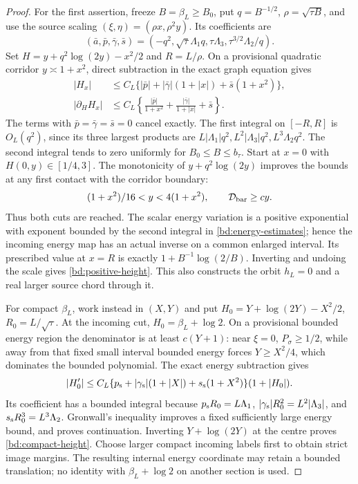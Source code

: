 \begin{proof}
For the first assertion, freeze \(B=\beta_L\ge B_0\), put
\(q=B^{-1/2}\), \(\rho=\sqrt{\tau B}\), and use the source
scaling \((\xi,\eta)=(\rho x,\rho^2y)\).  Its coefficients are
\[
 (\bar a,\bar p,\bar\gamma,\bar s)
 =(-q^2,\sqrt\tau\Lambda_1q,\tau\Lambda_3,
                         \tau^{3/2}\Lambda_2/q).
\]
Set \(H=y+q^2\log(2y)-x^2/2\) and \(R=L/\rho\).
On a provisional quadratic corridor \(y\asymp1+x^2\), direct
subtraction in the exact graph equation gives
\begin{equation}\label{bd:energy-estimates}
\begin{split}
 |H_x|&\le C_L\{|
 \bar p|+|\bar\gamma|(1+|x|)+\bar s(1+x^2)\},\\
 |\partial_HH_x|&\le C_L\left\{
 \frac{|\bar p|}{1+x^2}+
 \frac{|\bar\gamma|}{1+|x|}+\bar s\right\}.
\end{split}
\end{equation}
The terms with \(\bar p=\bar\gamma=\bar s=0\) cancel exactly.
The first integral on \([-R,R]\) is \(O_L(q^2)\), since its three
largest products are
\(L|\Lambda_1|q^2,L^2|\Lambda_3|q^2,L^3\Lambda_2q^2\).
The second integral tends to zero uniformly for
\(B_0\le B\le b_\tau\).  Start at \(x=0\) with
\(H(0,y)\in[1/4,3]\).  The monotonicity of
\(y+q^2\log(2y)\) improves the bounds at any first contact with the corridor boundary:
\[
 (1+x^2)/16<y<4(1+x^2),\qquad \mathcal D_{\rm bar}\ge cy.
\]
Thus both cuts are reached.  The scalar energy variation is a positive
exponential with exponent bounded by the second integral in
\eqref{bd:energy-estimates}; hence the incoming energy map has an
actual inverse on a common enlarged interval.  Its prescribed value at
\(x=R\) is exactly \(1+B^{-1}\log(2/B)\).  Inverting and undoing
the scale gives \eqref{bd:positive-height}.  This also constructs the
orbit \(h_L=0\) and a real larger source chord through it.

For compact \(\beta_L\), work instead in \((X,Y)\) and put
\(H_0=Y+\log(2Y)-X^2/2\), \(R_0=L/\sqrt\tau\).
At the incoming cut, \(H_0=\beta_L+\log2\).  On a provisional
bounded energy region the denominator is at least \(c(Y+1)\): near
\(\xi=0\), \(P_\sigma\ge1/2\), while away from that fixed small
interval bounded energy forces \(Y\ge X^2/4\), which dominates
the bounded polynomial.  The exact energy subtraction gives
\[
 |H_0'|\le C_L\{p_{\rm s}+|\gamma_{\rm s}|(1+|X|)
                +s_{\rm s}(1+X^2)\}(1+|H_0|).
\]
Its coefficient has a bounded integral because
\(p_{\rm s}R_0=L\Lambda_1\),
\(|\gamma_{\rm s}|R_0^2=L^2|\Lambda_3|\), and
\(s_{\rm s}R_0^3=L^3\Lambda_2\).  Gronwall's inequality improves a
fixed sufficiently large energy bound, and proves continuation.
Inverting \(Y+\log(2Y)\) at the centre proves
\eqref{bd:compact-height}.  Choose larger compact incoming labels
first to obtain strict image margins.  The resulting internal energy
coordinate may retain a bounded translation; no identity with
\(\beta_L+\log2\) on another section is used.


\end{proof}
